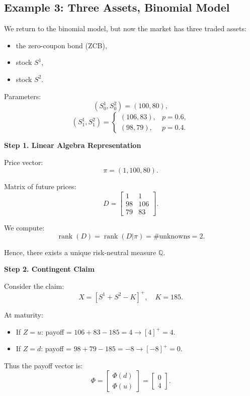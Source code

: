 \documentclass[12pt,a4paper]{article}
\theoremstyle{definition}
\newcommand{\Q}{\mathbb{Q}}
\begin{document}
\subsection{Example 3: Three Assets, Binomial Model}

We return to the binomial model, but now the market has three traded assets:
\begin{itemize}
\item the zero-coupon bond (ZCB),
\item stock $S^1$,
\item stock $S^2$.
\end{itemize}

Parameters:
\[
(S_0^1, S_0^2) = (100, 80),
\]
\[
(S_1^1, S_1^2) = \begin{cases}
(106, 83), & p = 0.6, \\
(98, 79), & p = 0.4.
\end{cases}
\]

\textbf{Step 1. Linear Algebra Representation}

Price vector:
\[
\pi = (1, 100, 80).
\]

Matrix of future prices:
\[
D = \begin{bmatrix}
1 & 1 \\
98 & 106 \\
79 & 83
\end{bmatrix}.
\]

We compute:
\[
\operatorname{rank}(D) = \operatorname{rank}(D|\pi) = \text{\# unknowns} = 2.
\]

Hence, there exists a unique risk-neutral measure $\Q$.

\textbf{Step 2. Contingent Claim}

Consider the claim:
\[
X = [S^1 + S^2 - K]^+, \quad K = 185.
\]

At maturity:
\begin{itemize}
\item If $Z = u$: payoff = $106 + 83 - 185 = 4 \rightarrow [4]^+ = 4$.
\item If $Z = d$: payoff = $98 + 79 - 185 = -8 \rightarrow [-8]^+ = 0$.
\end{itemize}

Thus the payoff vector is:
\[
\Phi = \begin{bmatrix}
\Phi(d) \\
\Phi(u)
\end{bmatrix} = \begin{bmatrix}
0 \\
4
\end{bmatrix}.
\]
\end{document}
